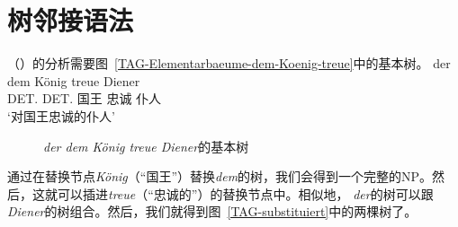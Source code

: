\section{树邻接语法}

（）的分析需要图~\vref{TAG-Elementarbaeume-dem-Koenig-treue}中的基本树。
\ea
\gll der        dem        König treue Diener\\
     DET.\nom{} DET.\dat{} 国王  忠诚 仆人\\
\glt `对国王忠诚的仆人'
\z

\begin{figure}
\hfill
{}
\hfill
{}
\hfill
{}
%
\hfill
%
%
\hfill
%
\hfill\mbox{}
\caption{\label{TAG-Elementarbaeume-dem-Koenig-treue}\emph{der dem König treue Diener}的基本树}
\end{figure}%

\noindent
通过在替换节点\emph{König}（“国王”）替换\emph{dem}的树，我们会得到一个完整的NP。然后，这就可以插进\emph{treue}（“忠诚的”）的替换节点中。相似地， \emph{der}的树可以跟\emph{Diener}的树组合。然后，我们就得到图~\vref{TAG-substituiert}中的两棵树了。

